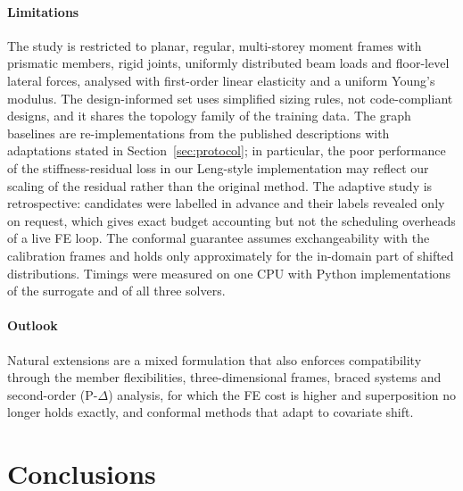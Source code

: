 \paragraph{Limitations} The study is restricted to planar, regular, multi-storey moment frames with prismatic members, rigid joints, uniformly distributed beam loads and floor-level lateral forces, analysed with first-order linear elasticity and a uniform Young's modulus. The design-informed set uses simplified sizing rules, not code-compliant designs, and it shares the topology family of the training data. The graph baselines are re-implementations from the published descriptions with adaptations stated in Section~\ref{sec:protocol}; in particular, the poor performance of the stiffness-residual loss in our Leng-style implementation may reflect our scaling of the residual rather than the original method. The adaptive study is retrospective: candidates were labelled in advance and their labels revealed only on request, which gives exact budget accounting but not the scheduling overheads of a live FE loop. The conformal guarantee assumes exchangeability with the calibration frames and holds only approximately for the in-domain part of shifted distributions. Timings were measured on one CPU with Python implementations of the surrogate and of all three solvers.

\paragraph{Outlook} Natural extensions are a mixed formulation that also enforces compatibility through the member flexibilities, three-dimensional frames, braced systems and second-order (P-$\Delta$) analysis, for which the FE cost is higher and superposition no longer holds exactly, and conformal methods that adapt to covariate shift.

\section{Conclusions}\label{sec:conclusions}


